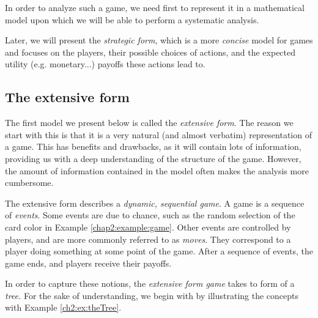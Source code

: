 In order to analyze such a game, we need first to represent it in a mathematical model upon which we will be able to perform a systematic analysis.



 Later, we will present the   \emph{strategic form}, which is a more \emph{concise} model for games and focuses on the players,  their possible choices of actions, and the expected utility (e.g. monetary...) payoffs  these actions lead to.


\subsection{The extensive form}
\label{subsec:ExtForm}
The first model we present below is called the \emph{extensive form}.
The reason we start with this is that it is a very natural (and almost verbatim) representation of a game.  This has benefits and drawbacks, as it will contain lots of information,  providing us with a deep understanding of the structure of the game. However,  the amount of information  contained in the model
 often makes the analysis more cumbersome.


The extensive form describes a \emph{dynamic, sequential game}. A game is a sequence of \emph{events}.
Some events are due to chance, such as the random selection of the card color in Example \ref{chap2:example:game}.
Other events are controlled by players, and are more commonly referred to as \emph{moves}.
They correspond to a player doing something at some point of the game.
After a sequence of events, the game ends, and players receive their payoffs.

In order to capture these notions, the \emph{extensive form game} takes to form of a \emph{tree.}
 For the sake of understanding, we begin with by illustrating the concepts with Example \ref{ch2:ex:theTree}.


